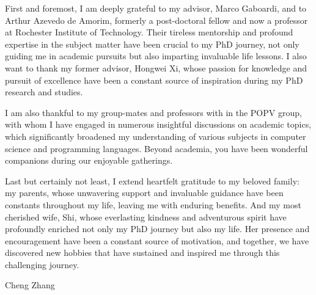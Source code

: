 First and foremost, I am deeply grateful to my advisor, Marco Gaboardi, and to Arthur Azevedo de Amorim, formerly a post-doctoral fellow and now a professor at Rochester Institute of Technology. Their tireless mentorship and profound expertise in the subject matter have been crucial to my PhD journey, not only guiding me in academic pursuits but also imparting invaluable life lessons. I also want to thank my former advisor, Hongwei Xi, whose passion for knowledge and pursuit of excellence have been a constant source of inspiration during my PhD research and studies.

I am also thankful to my group-mates and professors with in the POPV group, with whom I have engaged in numerous insightful discussions on academic topics, which significantly broadened my understanding of various subjects in computer science and programming languages. Beyond academia, you have been wonderful companions during our enjoyable gatherings.

Last but certainly not least, I extend heartfelt gratitude to my beloved family: my parents, whose unwavering support and invaluable guidance have been constants throughout my life, leaving me with enduring benefits. And my most cherished wife, Shi, whose everlasting kindness and adventurous spirit have profoundly enriched not only my PhD journey but also my life. Her presence and encouragement have been a constant source of motivation, and together, we have discovered new hobbies that have sustained and inspired me through this challenging journey.

\vskip 1in

\noindent
Cheng Zhang\\